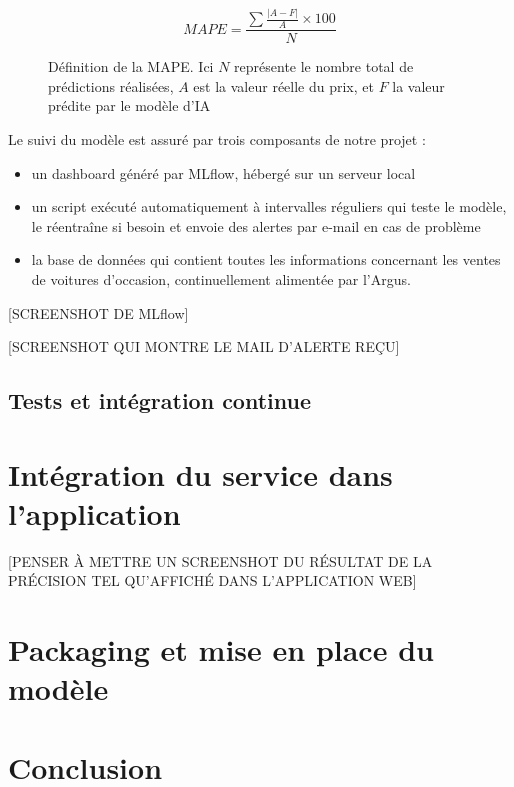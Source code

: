 \documentclass[french]{article}
\begin{document}
    \begin{figure}[h!]
        \begin{equation}MAPE = \frac {\sum \frac{\lvert A-F \rvert}{A} \times 100}{N}  \end{equation}
        \centering
        \caption{Définition de la MAPE. Ici $N$ représente le nombre total de prédictions réalisées, $A$ est la valeur réelle du prix, et $F$ la valeur prédite par le modèle d'IA}
        \centering
    \end{figure}

    Le suivi du modèle est assuré par trois composants de notre projet :
    \begin{itemize}
        \item un dashboard généré par MLflow, hébergé sur un serveur local
        \item un script exécuté automatiquement à intervalles réguliers qui teste le modèle, le réentraîne si besoin et envoie des alertes par e-mail en cas de problème
        \item la base de données qui contient toutes les informations concernant les ventes de voitures d'occasion, continuellement alimentée par l'Argus.
    \end{itemize}

    [SCREENSHOT DE MLflow]

    [SCREENSHOT QUI MONTRE LE MAIL D'ALERTE REÇU]

    \subsection{Tests et intégration continue}
    \section{Intégration du service dans l'application}

    [PENSER À METTRE UN SCREENSHOT DU RÉSULTAT DE LA PRÉCISION TEL QU'AFFICHÉ DANS L'APPLICATION WEB]

    \section{Packaging et mise en place du modèle}

    \newpage
    \section*{Conclusion}
    


    \newpage
    \begin{thebibliography}{5}
    \end{thebibliography}

    
\end{document}
